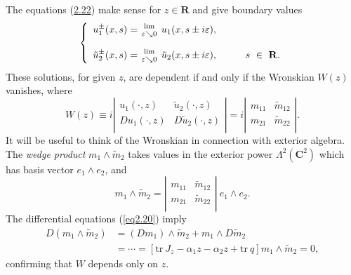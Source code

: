 \documentclass{surv-l}
\theoremstyle{plain}
\theoremstyle{definition}
\numberwithin{equation}{chapter}
\begin{document}
The equations (\hyperref[eq2.22-]{2.22}) make sense for $z\in \mathbf{R}$ and give boundary values
\begin{align}\label{eq2.25}
\left\{\begin{array}{ll}
u_{1}^{\pm}(x,s)={{\mathrm{lim}}\atop{\varepsilon\searrow 0}}\ u_{1}(x,s\pm i\varepsilon),&\\ \\
\tilde{u}_{2}^{\pm}(x,s)={{\mathrm{lim}}\atop{\varepsilon\searrow 0}}\ \tilde{u}_{2}(x,s\pm i\varepsilon),& \qquad s\ \in\ \mathbf{R}.\end{array}\right.
\end{align}
These solutions, for given $z$, are dependent if and only if the Wronskian $W(z)$ vanishes, where
\begin{equation}\label{eq2.26}
W(z)\equiv i\left|
             \begin{array}{cc}
               u_{1}(\cdot, z)& \tilde{u}_{2}(\cdot, z) \\
               Du_{1}(\cdot, z) & D\tilde{u}_{2}(\cdot, z) \\
             \end{array}
             \right|=i\left|
                        \begin{array}{cc}
                          m_{11} & \tilde{m}_{12} \\
                          m_{21} & \tilde{m}_{22} \\
                        \end{array}
                      \right|.
    \end{equation}
It will be useful to think of the Wronskian in connection with exterior algebra. The \emph{wedge product} $m_{1}\wedge\tilde{m}_{2}$ takes values in the exterior power $\Lambda^{2}(\mathbf{C}^{2})$ which has basis vector $e_{1}\wedge e_{2}$, and
\begin{equation*}
m_{1}\wedge\tilde{m}_{2}=\left|
                            \begin{array}{cc}
                              m_{11} & \tilde{m}_{12} \\
                               m_{21} & \tilde{m}_{22} \\
                            \end{array}
                          \right|\ e_{1} \wedge e_{2}.
\end{equation*}
The differential equations (\ref{eq2.20}) imply
\begin{align}\label{eq2.27}
D(m_{1}\wedge\tilde{m}_{2})&=(Dm_{1})\wedge\tilde{m}_{2}+m_{1}\wedge D\tilde{m}_{2}\\ \nonumber
&=\cdots= [\mathrm{tr}\ J_{z}-\alpha_{1}z-\alpha_{2}z+ \mathrm{tr}\ q]m_{1}\wedge\tilde{m}_{2}=0,
\end{align}
confirming that $W$ depends only on $z$.
\end{document}
